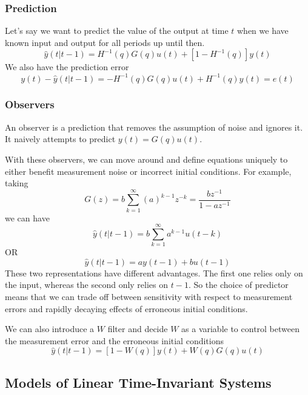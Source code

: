 \subsubsection{Prediction}
Let's say we want to predict the value of the output at time $t$ when we have known input and output for all periods up until then.
\begin{equation}
    \hat{y}(t|t-1) = H^{-1} (q) G(q) u(t) + [1- H^{-1} (q)] y(t)
\end{equation}
We also have the prediction error
\begin{equation}
    y(t) - \hat{y}(t | t-1) = -H^{-1} (q) G(q) u(t) + H^{-1}(q)y(t) = e(t)
\end{equation}

\subsubsection{Observers}
An observer is a prediction that removes the assumption of noise and ignores it.
It naively attempts to predict $y(t) = G(q) u(t)$.

With these observers, we can move around and define equations uniquely to either benefit measurement noise or incorrect initial conditions.
For example, taking
\begin{equation}
    G(z) = b \sum_{k=1}^{\infty} (a)^{k-1} z^{-k} = \frac{b z^{-1}}{1-az^{-1}}
\end{equation}
we can have
\begin{equation}
    \hat{y}(t|t-1) = b \sum_{k=1}^{\infty} a^{k-1} u(t-k)
\end{equation}
OR
\begin{equation}
   \hat{y}(t|t-1) = a y(t-1) + b u(t-1)
\end{equation}
These two representations have different advantages.
The first one relies only on the input, whereas the second only relies on $t-1$. 
So the choice of predictor means that we can trade off between sensitivity with respect to measurement errors and rapidly decaying effects of erroneous initial conditions.

We can also introduce a $W$ filter and decide $W$ as a variable to control between the measurement error and the erroneous initial conditions
\begin{equation}
    \hat{y}(t | t-1) = [1-W(q)]y(t) + W(q)G(q)u(t)
\end{equation}

\subsection{Models of Linear Time-Invariant Systems}
